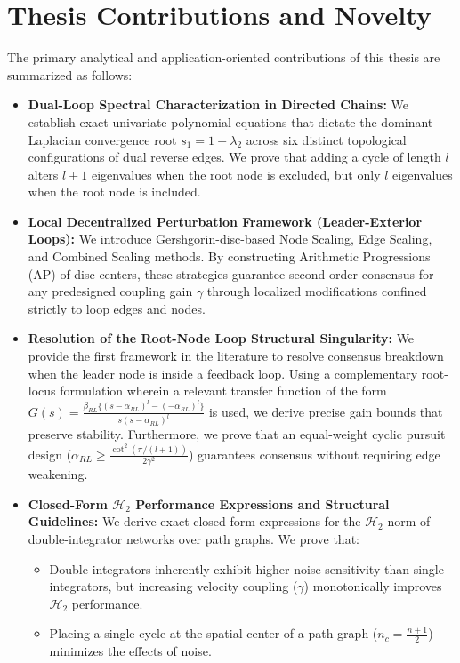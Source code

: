 \documentclass[openright,twoside]{iitbthesis}
\begin{document}
\section{Thesis Contributions and Novelty}
The primary analytical and application-oriented contributions of this thesis are summarized as follows:
\begin{itemize}
    \item \textbf{Dual-Loop Spectral Characterization in Directed Chains:} We establish exact univariate polynomial equations that dictate the dominant Laplacian convergence root $s_1 = 1 - \lambda_2$ across six distinct topological configurations of dual reverse edges. We prove that adding a cycle of length $l$ alters $l+1$ eigenvalues when the root node is excluded, but only $l$ eigenvalues when the root node is included.
    \item \textbf{Local Decentralized Perturbation Framework (Leader-Exterior Loops):} We introduce Gershgorin-disc-based Node Scaling, Edge Scaling, and Combined Scaling methods. By constructing Arithmetic Progressions (AP) of disc centers, these strategies guarantee second-order consensus for any predesigned coupling gain $\gamma$ through localized modifications confined strictly to loop edges and nodes.
    \item \textbf{Resolution of the Root-Node Loop Structural Singularity:} We provide the first framework in the literature to resolve consensus breakdown when the leader node is inside a feedback loop. Using a complementary root-locus formulation wherein a relevant transfer function of the form $G(s) = \frac{\beta_{RL}\{(s-\alpha_{RL})^l - (-\alpha_{RL})^l\}}{s(s-\alpha_{RL})^l}$ is used, we derive precise gain bounds that preserve stability. Furthermore, we prove that an equal-weight cyclic pursuit design ($\alpha_{RL} \ge \frac{\cot^2(\pi/(l+1))}{2\gamma^2}$) guarantees consensus without requiring edge weakening.
    \item \textbf{Closed-Form $\mathcal{H}_2$ Performance Expressions and Structural Guidelines:} We derive exact closed-form expressions for the $\mathcal{H}_2$ norm of double-integrator networks over path graphs. We prove that: 
        \begin{itemize}
            \item Double integrators inherently exhibit higher noise sensitivity than single integrators, but increasing velocity coupling ($\gamma$) monotonically improves $\mathcal{H}_2$ performance.
            \item Placing a single cycle at the spatial center of a path graph ($n_c = \frac{n+1}{2}$) minimizes the effects of noise.

\end{itemize}
\end{itemize}
\end{document}
